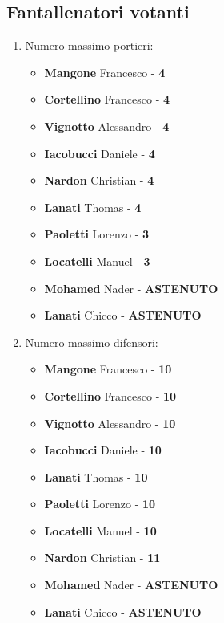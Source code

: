 \documentclass[12pt]{article}
\begin{document}
\subsection*{Fantallenatori votanti}
\begin{enumerate}
    \item Numero massimo portieri:
    \begin{itemize}
        \item \textbf{Mangone} Francesco - \textbf{4}
        \item \textbf{Cortellino} Francesco - \textbf{4}
        \item \textbf{Vignotto} Alessandro - \textbf{4}
        \item \textbf{Iacobucci} Daniele - \textbf{4}
        \item \textbf{Nardon} Christian - \textbf{4}
        \item \textbf{Lanati} Thomas - \textbf{4}
        \item \textbf{Paoletti} Lorenzo - \textbf{3}
        \item \textbf{Locatelli} Manuel - \textbf{3}
        \item \textbf{Mohamed} Nader - \textbf{ASTENUTO}
        \item \textbf{Lanati} Chicco - \textbf{ASTENUTO}
    \end{itemize}

    \item Numero massimo difensori:
    \begin{itemize}
        \item \textbf{Mangone} Francesco - \textbf{10}
        \item \textbf{Cortellino} Francesco - \textbf{10}
        \item \textbf{Vignotto} Alessandro - \textbf{10}
        \item \textbf{Iacobucci} Daniele - \textbf{10}
        \item \textbf{Lanati} Thomas - \textbf{10}
        \item \textbf{Paoletti} Lorenzo - \textbf{10}
        \item \textbf{Locatelli} Manuel - \textbf{10}
        \item \textbf{Nardon} Christian - \textbf{11}
        \item \textbf{Mohamed} Nader - \textbf{ASTENUTO}
        \item \textbf{Lanati} Chicco - \textbf{ASTENUTO}
    \end{itemize}


\end{enumerate}
\end{document}
